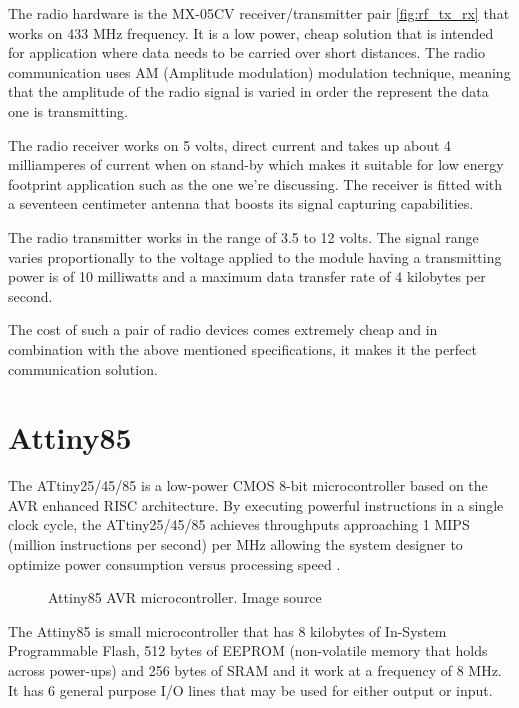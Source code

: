 The radio hardware is the MX-05CV receiver/transmitter pair \ref{fig:rf_tx_rx} that works on 433 MHz
frequency. It is a low power, cheap solution that is intended for application where data needs to be carried
over short distances. The radio communication uses AM (Amplitude modulation) modulation technique, meaning
that the amplitude of the radio signal is varied in order the represent the data one is transmitting.

The radio receiver works on 5 volts, direct current and takes up about 4 milliamperes of current when on stand-by
which makes it suitable for low energy footprint application such as the one we're discussing. The receiver is
fitted with a seventeen centimeter antenna that boosts its signal capturing capabilities.

The radio transmitter works in the range of 3.5 to 12 volts. The signal range  varies proportionally to the
voltage applied to the module having a transmitting power is of 10 milliwatts and a maximum data transfer rate
of 4 kilobytes per second.

The cost of such a pair of radio devices comes extremely cheap and in combination with the above mentioned
specifications, it makes it the perfect communication solution.

\section{Attiny85}
\label{sec:attiny85}

The ATtiny25/45/85 is a low-power CMOS 8-bit microcontroller based on the AVR enhanced RISC architecture. By
executing powerful instructions in a single clock cycle, the ATtiny25/45/85 achieves throughputs approaching 1
MIPS (million instructions per second) per MHz allowing the system designer to optimize power consumption
versus processing speed
\cite{datasheet:attiny85}.

\begin{figure}[h!]
    \label{fig:attiny85}
    \centerline{}
    \caption[Attiny85 AVR microcontroller]{Attiny85 AVR microcontroller. Image source
                                           \cite{website:attiny85pic}}
    \label{fig:attiny85}
\end{figure}


The Attiny85 is small microcontroller that has 8 kilobytes of In-System Programmable Flash, 512 bytes of
EEPROM (non-volatile memory that holds across power-ups) and 256 bytes of SRAM and it work at a frequency of
8 MHz. It has 6 general purpose I/O lines that may be used for either output or input.

